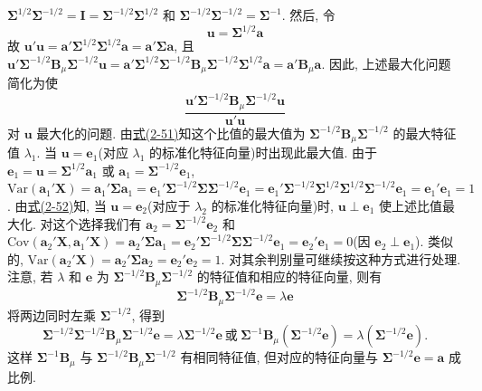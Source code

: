 
$\boldsymbol{\Sigma}^{1/2}\boldsymbol{\Sigma}^{-1/2}=\mathbf{I}=\boldsymbol{\Sigma}^{-1/2}\boldsymbol{\Sigma}^{1/2}$ 和 $\boldsymbol{\Sigma}^{-1/2}\boldsymbol{\Sigma}^{-1/2}=\boldsymbol{\Sigma}^{-1}$. 然后, 令
\[
\mathbf{u}=\boldsymbol{\Sigma}^{1/2}\mathbf{a}
\]
故 $\mathbf{u}'\mathbf{u}=\mathbf{a}'\boldsymbol{\Sigma}^{1/2}\boldsymbol{\Sigma}^{1/2}\mathbf{a}=\mathbf{a}'\boldsymbol{\Sigma}\mathbf{a}$, 且 $\mathbf{u}'\boldsymbol{\Sigma}^{-1/2}\mathbf{B}_\mu\boldsymbol{\Sigma}^{-1/2}\mathbf{u}=\mathbf{a}'\boldsymbol{\Sigma}^{1/2}\boldsymbol{\Sigma}^{-1/2}\mathbf{B}_\mu\boldsymbol{\Sigma}^{-1/2}\boldsymbol{\Sigma}^{1/2}\mathbf{a}=\mathbf{a}'\mathbf{B}_\mu\mathbf{a}$. 因此, 上述最大化问题简化为使
\[
\frac{\mathbf{u}'\boldsymbol{\Sigma}^{-1/2}\mathbf{B}_\mu\boldsymbol{\Sigma}^{-1/2}\mathbf{u}}{\mathbf{u}'\mathbf{u}}
\]
对 $\mathbf{u}$ 最大化的问题. 由\hyperref[eq:2-51]{式(2-51)}知这个比值的最大值为 $\boldsymbol{\Sigma}^{-1/2}\mathbf{B}_\mu\boldsymbol{\Sigma}^{-1/2}$ 的最大特征值 $\lambda_1$. 当 $\mathbf{u}=\mathbf{e}_1$(对应 $\lambda_1$ 的标准化特征向量)时出现此最大值. 由于 $\mathbf{e}_1=\mathbf{u}=\boldsymbol{\Sigma}^{1/2}\mathbf{a}_1$ 或 $\mathbf{a}_1=\boldsymbol{\Sigma}^{-1/2}\mathbf{e}_1$, $\mathrm{Var}(\mathbf{a}_1'\mathbf{X})=\mathbf{a}_1'\boldsymbol{\Sigma}\mathbf{a}_1=\mathbf{e}_1'\boldsymbol{\Sigma}^{-1/2}\boldsymbol{\Sigma}\boldsymbol{\Sigma}^{-1/2}\mathbf{e}_1=\mathbf{e}_1'\boldsymbol{\Sigma}^{-1/2}\boldsymbol{\Sigma}^{1/2}\boldsymbol{\Sigma}^{1/2}\boldsymbol{\Sigma}^{-1/2}\mathbf{e}_1=\mathbf{e}_1'\mathbf{e}_1=1$. 由\hyperref[eq:2-52]{式(2-52)}知, 当 $\mathbf{u}=\mathbf{e}_2$(对应于 $\lambda_2$ 的标准化特征向量)时, $\mathbf{u}\perp\mathbf{e}_1$ 使上述比值最大化. 对这个选择我们有 $\mathbf{a}_2=\boldsymbol{\Sigma}^{-1/2}\mathbf{e}_2$ 和 $\mathrm{Cov}(\mathbf{a}_2'\mathbf{X},\mathbf{a}_1'\mathbf{X})=\mathbf{a}_2'\boldsymbol{\Sigma}\mathbf{a}_1=\mathbf{e}_2'\boldsymbol{\Sigma}^{-1/2}\boldsymbol{\Sigma}\boldsymbol{\Sigma}^{-1/2}\mathbf{e}_1=\mathbf{e}_2'\mathbf{e}_1=0$(因 $\mathbf{e}_2\perp\mathbf{e}_1$). 类似的, $\mathrm{Var}(\mathbf{a}_2'\mathbf{X})=\mathbf{a}_2'\boldsymbol{\Sigma}\mathbf{a}_2=\mathbf{e}_2'\mathbf{e}_2=1$. 对其余判别量可继续按这种方式进行处理. 注意, 若 $\lambda$ 和 $\mathbf{e}$ 为 $\boldsymbol{\Sigma}^{-1/2}\mathbf{B}_\mu\boldsymbol{\Sigma}^{-1/2}$ 的特征值和相应的特征向量, 则有
\[
\boldsymbol{\Sigma}^{-1/2}\mathbf{B}_\mu\boldsymbol{\Sigma}^{-1/2}\mathbf{e}=\lambda\mathbf{e}
\]
将两边同时左乘 $\boldsymbol{\Sigma}^{-1/2}$, 得到
\[
\boldsymbol{\Sigma}^{-1/2}\boldsymbol{\Sigma}^{-1/2}\mathbf{B}_\mu\boldsymbol{\Sigma}^{-1/2}\mathbf{e}=\lambda\boldsymbol{\Sigma}^{-1/2}\mathbf{e}\ \text{或}\ \boldsymbol{\Sigma}^{-1}\mathbf{B}_\mu(\boldsymbol{\Sigma}^{-1/2}\mathbf{e})=\lambda(\boldsymbol{\Sigma}^{-1/2}\mathbf{e}).
\]
这样 $\boldsymbol{\Sigma}^{-1}\mathbf{B}_\mu$ 与 $\boldsymbol{\Sigma}^{-1/2}\mathbf{B}_\mu\boldsymbol{\Sigma}^{-1/2}$ 有相同特征值, 但对应的特征向量与 $\boldsymbol{\Sigma}^{-1/2}\mathbf{e}=\mathbf{a}$ 成比例.

